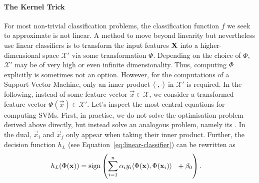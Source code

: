 \documentclass[
	fontsize=10pt, %
	twoside=false, %
	secnumdepth=1, %
  toc=indentunnumbered %
]{kaobook}
\begin{document}
\paragraph{The Kernel Trick} For most non-trivial classification problems, the
classification function $f$ we seek to approximate is not linear. A method to
move beyond linearity but nevertheless use linear classifiers is to transform
the input features $\mathbf{X}$ into a higher-dimensional space $\mathcal{X}'$ via
some transformation $\Phi$. Depending on the choice of $\Phi$, $\mathcal{X'}$
may be of very high or even infinite dimensionality. Thus, computing $\Phi$
explicitly is sometimes not an option. However, for the computations of a
Support Vector Machine, only an inner product $\langle \cdot, \cdot \rangle$ in
$\mathcal{X}'$ is required. In the following, instead of some feature vector
$\vec x \in \mathcal{X}$, we consider a transformed feature vector $\Phi(\vec x)
\in \mathcal{X} '$.
%
Let's inspect the most central equations for computing SVMs. First, in practise,
we do not solve the optimisation problem derived above directly, but instead
solve an analogous problem, namely its . In the dual, $\vec
x_i$ and $\vec x_j$ only appear when taking their inner product.
%
Further, the decision function $h_L$ (see Equation~\ref{eq:linear-classifier}) can be
rewritten as
\begin{align*}
  h_L(\Phi(\mathbf{x})) & = \text{sign}\left( \sum_{i=1}^n \alpha_i y_i \langle \Phi(\mathbf{x}), \Phi(\mathbf{x}_i) \rangle ~~ + \beta_0 \right).
\end{align*}
\end{document}
